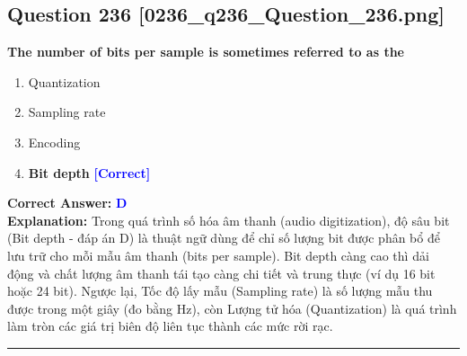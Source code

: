 \documentclass[11pt,a4paper]{article}
\begin{document}
\begin{minipage}{\textwidth}
\subsection*{Question 236 \quad \footnotesize{[0236\_q236\_Question\_236.png]}}
\noindent \textbf{The number of bits per sample is sometimes referred to as the}

\begin{enumerate}[label=\Alph*.]
    \item Quantization
    \item Sampling rate
    \item Encoding
    \item \textbf{Bit depth} \hfill \textcolor{blue}{\textbf{[Correct]}}
\end{enumerate}

\noindent \textbf{Correct Answer:} \textcolor{blue}{\textbf{D}} \\[2pt]
\noindent \textbf{Explanation:} Trong quá trình số hóa âm thanh (audio digitization), độ sâu bit (Bit depth - đáp án D) là thuật ngữ dùng để chỉ số lượng bit được phân bổ để lưu trữ cho mỗi mẫu âm thanh (bits per sample). Bit depth càng cao thì dải động và chất lượng âm thanh tái tạo càng chi tiết và trung thực (ví dụ 16 bit hoặc 24 bit). Ngược lại, Tốc độ lấy mẫu (Sampling rate) là số lượng mẫu thu được trong một giây (đo bằng Hz), còn Lượng tử hóa (Quantization) là quá trình làm tròn các giá trị biên độ liên tục thành các mức rời rạc.

\par\vspace{0.3cm}
\hrule
\vspace{0.3cm}
\end{minipage}
\end{document}
